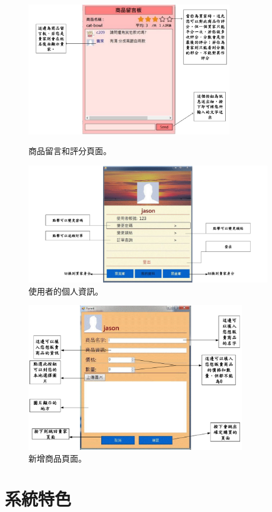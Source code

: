 \documentclass{scrreprt}
\begin{document}
\begin{CJK}{UTF8}{bkai}
\begin{figure}[t]
	\centering
	\includegraphics[width=0.80\textwidth]{star.pdf}
	\caption{商品留言和評分頁面。}
	\centering
	\includegraphics[width=0.95\textwidth]{Info.pdf}
	\caption{使用者的個人資訊。}
\end{figure}

\begin{figure}[t]
	\centering
	\includegraphics[width=0.85\textwidth]{addpro.pdf}
	\caption{新增商品頁面。}
\end{figure}

\chapter{系統特色}

\end{CJK}
\end{document}
